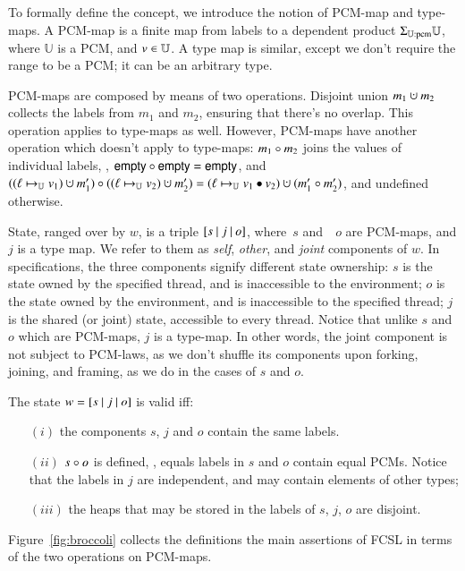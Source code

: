 To formally define the concept, we introduce the notion of PCM-map and
type-maps.  A PCM-map is a finite map from labels to a dependent
product $\Sigma_{{\mathbb{U}}{:}\textrm{pcm}} \mathbb{U}$, where
$\mathbb{U}$ is a PCM, and $v \in \mathbb{U}$. A type map is similar,
except we don't require the range to be a PCM; it can be an arbitrary
type.

PCM-maps are composed by means of two operations. Disjoint union $m_1
\hunion m_2$ collects the labels from $m_1$ and $m_2$, ensuring that
there's no overlap. This operation applies to type-maps as well.
%
However, PCM-maps have another operation which doesn't apply to
type-maps: $m_1 \circ m_2$ joins the values of individual labels, \ie,
$\mathsf{empty} \circ \mathsf{empty} = \mathsf{empty}$, and $((\hlabel \hpts_{\pcmS}
v_1) \hunion m'_1) \zip ((\hlabel \hpts_{\pcmS} v_2) \hunion m'_2)
= (\hlabel \hpts_{\pcmS} v_1 \join v_2) \hunion (m'_1 \zip m'_2)$,
and undefined otherwise.

State, ranged over by $w$, is a triple $[{s}~|~{j}~|~{o}]$, where~$s$
and~~$o$ are PCM-maps, and $j$ is a type map. We refer to them as
\emph{self}, \emph{other}, and \emph{joint} components of $w$.  In
specifications, the three components signify different state
ownership: $s$ is the state owned by the specified thread, and is
inaccessible to the environment; $o$ is the state owned by the
environment, and is inaccessible to the specified thread; $j$ is the
shared (or joint) state, accessible to every thread.
%
Notice that unlike $s$ and $o$ which are PCM-maps, $j$ is a
type-map. In other words, the joint component is not subject to
PCM-laws, as we don't shuffle its components upon forking, joining,
and framing, as we do in the cases of $s$ and $o$.

The state $w = [{s}~|~{j}~|~{o}]$ is valid iff:
\begin{itemize}
\item[$(i)$] the components $s$, $j$ and $o$ contain the same labels.
 
\item[$(ii)$] $s\ {\circ}\ o$ is defined, \ie, equals labels in $s$ and $o$
  contain equal PCMs. Notice that the labels in $j$ are independent,
  and may contain elements of other types;
\item[$(iii)$] the heaps that may be stored in the labels of $s$, $j$,
  $o$ are disjoint.
\end{itemize}

Figure~\ref{fig:broccoli} collects the definitions the main assertions
of FCSL in terms of the two operations on PCM-maps.
%


